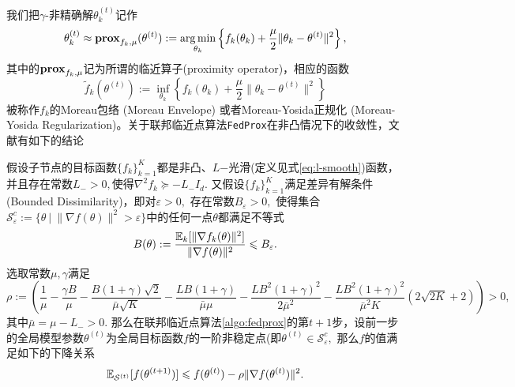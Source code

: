 我们把$\gamma$-非精确解$\theta_k^{(t)}$记作
\begin{equation}
\label{eq:prox-op}
\theta_k^{(t)} \approx \mathbf{prox}_{f_k, \mu} (\theta^{(t)}) := \operatorname*{arg\,min}\limits_{\theta_k} \left\{ f_k(\theta_k) + \frac{\mu}{2} \lVert \theta_k - \theta^{(t)} \rVert^2 \right\},
\end{equation}
其中的$\mathbf{prox}_{f_k, \mu}$记为所谓的临近算子(proximity operator)，相应的函数
\begin{equation}
\label{eq:moreau_env}
\tilde{f}_k (\theta^{(t)}) := \inf\limits_{\theta_k} \left\{ f_k(\theta_k) + \frac{\mu}{2} \lVert \theta_k - \theta^{(t)} \rVert^2 \right\}
\end{equation}
被称作$f_k$的Moreau包络 (Moreau Envelope) 或者Moreau-Yosida正规化 (Moreau-Yosida Regularization)。关于联邦临近点算法\texttt{FedProx}在非凸情况下的收敛性，文献\parencite{sahu2018fedprox}有如下的结论
\begin{theorem}
\label{thm:fedprox}
假设子节点的目标函数$\{f_k\}_{k=1}^K$都是非凸、$L$−光滑(定义见式\eqref{eq:l-smooth})函数，并且存在常数$L_- > 0,$使得$\nabla^2 f_k \succcurlyeq -L_- I_d.$ 又假设$\{f_k\}_{k=1}^K$满足差异有解条件(Bounded Dissimilarity)，即对$\varepsilon > 0,$ 存在常数$B_{\varepsilon} > 0,$ 使得集合$\mathcal{S}_{\varepsilon}^c := \{ \theta ~|~ \lVert \nabla f(\theta) \rVert^2 > \varepsilon\}$中的任何一点$\theta$都满足不等式
\begin{equation}
\label{eq:fedprox_bdd_dissim}
B(\theta) := \frac{\operatorname*{\mathbb{E}}_k [\lVert \nabla f_k(\theta) \rVert^2]}{\lVert \nabla f(\theta) \rVert^2} \leqslant B_{\varepsilon}.
\end{equation}
选取常数$\mu, \gamma$满足
\begin{equation*}
\rho := \left( \frac{1}{\mu} - \frac{\gamma B}{\mu} - \frac{B(1+\gamma)\sqrt{2}}{\bar{\mu}\sqrt{K}} - \frac{LB(1+\gamma)}{\bar{\mu}\mu} - \frac{LB^2(1+\gamma)^2}{2\bar{\mu}^2} - \frac{LB^2(1+\gamma)^2}{\bar{\mu}^2 K} \left( 2\sqrt{2K} + 2 \right) \right) > 0,
\end{equation*}
其中$\bar{\mu} = \mu - L_- > 0.$ 那么在联邦临近点算法\ref{algo:fedprox}的第$t+1$步，设前一步的全局模型参数$\theta^{(t)}$为全局目标函数$f$的一阶非稳定点(即$\theta^{(t)} \in \mathcal{S}_{\varepsilon}^c,$ 那么$f$的值满足如下的下降关系
\begin{equation*}
\operatorname*{\mathbb{E}}\nolimits_{\mathcal{S}^{(t)}}[f(\theta^{(t+1)})] \leqslant f(\theta^{(t)}) - \rho \lVert \nabla f (\theta^{(t)}) \rVert^2.
\end{equation*}
\end{theorem}

